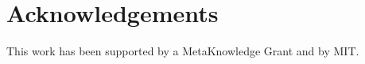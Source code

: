 \documentclass{sig-alternate}
\begin{document}

\section{Acknowledgements}

This work has been supported by a MetaKnowledge Grant and by MIT.

%
%
\end{document}
